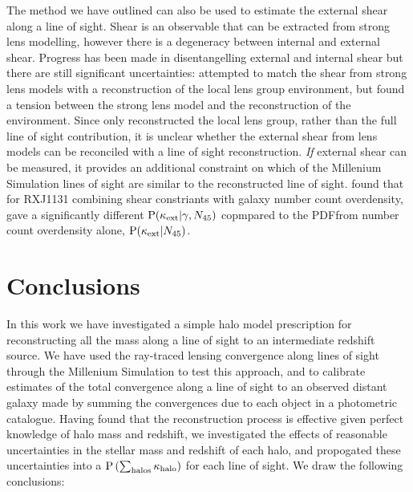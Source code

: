 \documentclass[useAMS,usenatbib]{mn2e}
\begin{document}
The method we have outlined can also be used to estimate the external shear
along a line of sight. Shear is an observable that can be extracted from
strong lens modelling, however there is a degeneracy between internal and
external shear. Progress has been made in disentangelling external and
internal shear \citep[\eg][]{xxx} but there are still significant
uncertainties: \citet{Wong} attempted to match the shear from strong lens
models with a reconstruction of the local lens group environment, but found a
tension between the strong lens model and the reconstruction of the
environment. Since \citet{Wong} only reconstructed the local lens group,
rather than the full line of sight contribution, it is unclear whether the
external shear from lens models can be reconciled with a line of sight
reconstruction. {\it If} external shear can be measured, it provides an
additional constraint on which of the Millenium Simulation lines of sight are
similar to the reconstructed line of sight. \citet{Suyu2012b} found that for RXJ1131 combining shear constriants with galaxy number count overdensity, gave a significantly different ${\rm P}(\kappa_{\rm ext}|\gamma,N_{45})$ copmpared to the PDFfrom number count overdensity alone, ${\rm P}(\kappa_{\rm ext}|N_{45})$. 




\section{Conclusions}
\label{sec:conclude}

In this work we have investigated a simple halo model prescription for
reconstructing all the mass along a line of sight to an intermediate redshift
source. We have used the ray-traced lensing convergence along lines of sight
through the Millenium Simulation to test this approach, and to calibrate
estimates of the total convergence along a line of sight to an observed
distant galaxy made by summing the convergences due to each object in a
photometric catalogue. Having found that the reconstruction process is effective given perfect
knowledge of halo mass and redshift, we investigated the effects of reasonable
uncertainties in the stellar mass and redshift of each halo, and propogated
these uncertainties into a ${\rm P}\left(\sum_{\rm halos} \kappa_{\rm halo}\right)$ for each line of
sight. We draw the following conclusions:
\end{document}
